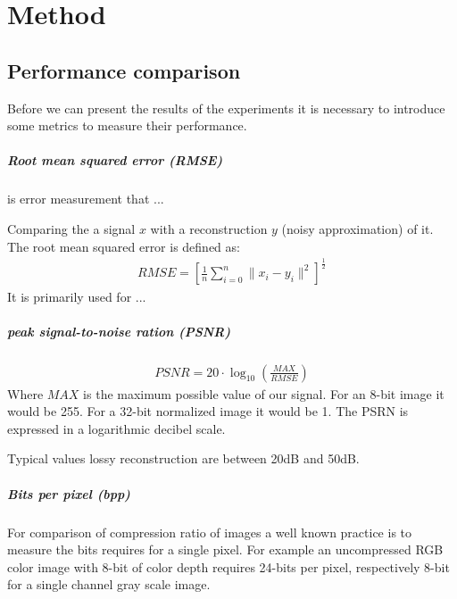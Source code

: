 \chapter{Method}


\section{Performance comparison}

Before we can present the results of the experiments it is necessary to
introduce some metrics to measure their performance.


\paragraph{Root mean squared error (RMSE)} is error measurement that ...

Comparing the a signal $x$ with a reconstruction $y$ (noisy approximation) of
it. The root mean squared error is defined as:
\begin{align}
 RMSE = \left[\frac{1}{n} \sum_{i=0}^{n}{\lVert x_i - y_i\rVert^{2}}
\right]^{\frac{1}{2}}
\end{align}
It is primarily used for ...

\paragraph{peak signal-to-noise ration (PSNR)}


\begin{align}
 PSNR = 20 \cdot \log_{10} \left(\frac{MAX}{RMSE}\right)
\end{align}
Where $MAX$ is the maximum possible value of our signal. For an 8-bit image it
would be 255. For a 32-bit normalized image it would be 1. The PSRN is expressed
in a logarithmic decibel scale.

Typical values lossy reconstruction are between 20dB and 50dB.




\paragraph{Bits per pixel (bpp)}
For comparison of compression ratio of images a well known practice is to
measure the bits requires for a single pixel. For example an uncompressed RGB
color image with 8-bit of color depth requires 24-bits per pixel, respectively
8-bit for a single channel gray scale image.

